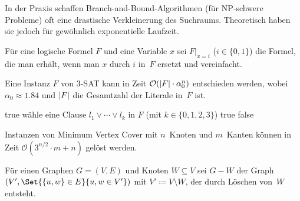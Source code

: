\documentclass{cheat-sheet}
\renewcommand{\O}{\mathcal{O}} %
\begin{document}
\begin{bem}
  In der Praxis schaffen Branch-and-Bound-Algorithmen (für NP-schwere Probleme) oft eine drastische Verkleinerung des Suchraums.
  Theoretisch haben sie jedoch für gewöhnlich exponentielle Laufzeit.
\end{bem}


\begin{nota}
  Für eine logische Formel $F$ und eine Variable $x$ sei $F|_{x=i}$ ($i \in \{0,1\}$) die Formel, die man erhält, wenn man $x$ durch $i$ in~$F$ ersetzt und vereinfacht.
\end{nota}

\begin{satz}
  Eine Instanz $F$ von 3-SAT kann in Zeit $\O(\abs{F} \cdot \alpha_0^n)$ entschieden werden, wobei $\alpha_0 \approx 1.84$ und $\lvert F\rvert$ die Gesamtzahl der Literale in~$F$ ist.
\end{satz}

\begin{algorithmic}
      \Return true
    \EndIf
    \State wähle eine Clause $l_1 \vee \cdots \vee l_k$ in $F$ (mit $k \in \{ 0, 1, 2, 3 \}$)
        \Return true
      \EndIf
    \EndFor
    \State \Return false
  \EndFunction
\end{algorithmic}


\begin{satz}
  Instanzen von Minimum Vertex Cover mit $n$~Knoten und $m$~Kanten können in Zeit $\O(3^{n/2} \cdot m + n)$ gelöst werden.
\end{satz}

\begin{nota}
  Für einen Graphen $G = (V, E)$ und Knoten $W \subseteq V$ sei $G - W$ der Graph $(V', \Set{\{u, w\} \in E}{u, w \in V'})$ mit $V' \coloneqq V \setminus W$, der durch Löschen von~$W$ entsteht.
\end{nota}
\end{document}
